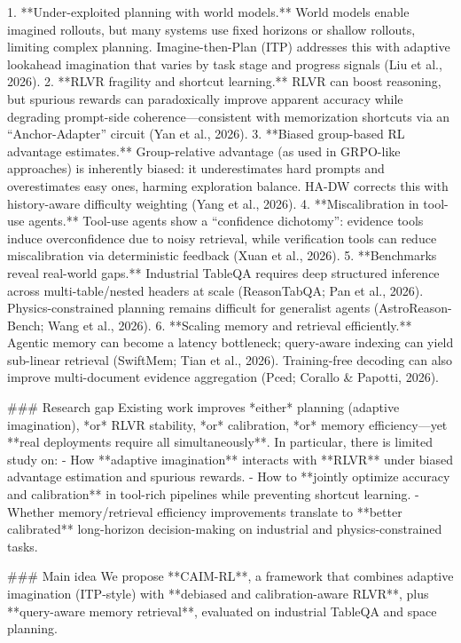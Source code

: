 1. **Under-exploited planning with world models.** World models enable imagined rollouts, but many systems use fixed horizons or shallow rollouts, limiting complex planning. Imagine-then-Plan (ITP) addresses this with adaptive lookahead imagination that varies by task stage and progress signals (Liu et al., 2026).  
2. **RLVR fragility and shortcut learning.** RLVR can boost reasoning, but spurious rewards can paradoxically improve apparent accuracy while degrading prompt-side coherence—consistent with memorization shortcuts via an “Anchor-Adapter” circuit (Yan et al., 2026).  
3. **Biased group-based RL advantage estimates.** Group-relative advantage (as used in GRPO-like approaches) is inherently biased: it underestimates hard prompts and overestimates easy ones, harming exploration balance. HA-DW corrects this with history-aware difficulty weighting (Yang et al., 2026).  
4. **Miscalibration in tool-use agents.** Tool-use agents show a “confidence dichotomy”: evidence tools induce overconfidence due to noisy retrieval, while verification tools can reduce miscalibration via deterministic feedback (Xuan et al., 2026).  
5. **Benchmarks reveal real-world gaps.** Industrial TableQA requires deep structured inference across multi-table/nested headers at scale (ReasonTabQA; Pan et al., 2026). Physics-constrained planning remains difficult for generalist agents (AstroReason-Bench; Wang et al., 2026).  
6. **Scaling memory and retrieval efficiently.** Agentic memory can become a latency bottleneck; query-aware indexing can yield sub-linear retrieval (SwiftMem; Tian et al., 2026). Training-free decoding can also improve multi-document evidence aggregation (Pced; Corallo & Papotti, 2026).

### Research gap  
Existing work improves *either* planning (adaptive imagination), *or* RLVR stability, *or* calibration, *or* memory efficiency—yet **real deployments require all simultaneously**. In particular, there is limited study on:  
- How **adaptive imagination** interacts with **RLVR** under biased advantage estimation and spurious rewards.  
- How to **jointly optimize accuracy and calibration** in tool-rich pipelines while preventing shortcut learning.  
- Whether memory/retrieval efficiency improvements translate to **better calibrated** long-horizon decision-making on industrial and physics-constrained tasks.

### Main idea  
We propose **CAIM-RL**, a framework that combines adaptive imagination (ITP-style) with **debiased and calibration-aware RLVR**, plus **query-aware memory retrieval**, evaluated on industrial TableQA and space planning.

